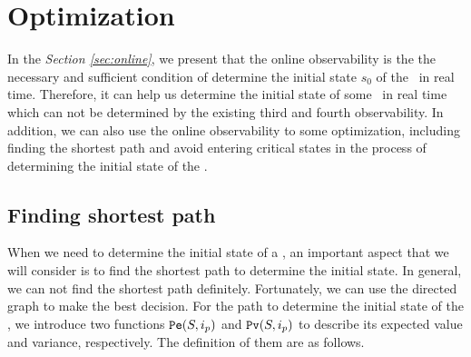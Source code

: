 \section{Optimization}
\label{sec:app}

In the {\em Section \ref{sec:online}}, we present that the online observability is the the necessary and sufficient condition of determine the initial state $s_0$ of the \BCNs\ in real time. Therefore, it can help us determine the initial state of some \BCNs\ in real time which can not be determined by the existing third and fourth observability. In addition, we can also use the online observability to some optimization, including finding the shortest path and avoid entering critical states in the process of determining the initial state of the \BCNs. %


\subsection{Finding shortest path}
When we need to determine the initial state of a \BCN, an important aspect that we will consider is to find the shortest path to determine the initial state. In general, we can not find the shortest path definitely. Fortunately, we can use the directed graph to make the best decision. For the path to determine the initial state of the \BCNs, we introduce two functions ${\tt Pe}(S, i_p)$ and ${\tt Pv}(S, i_p)$ to describe its expected value and variance, respectively. The definition of them are as follows.



